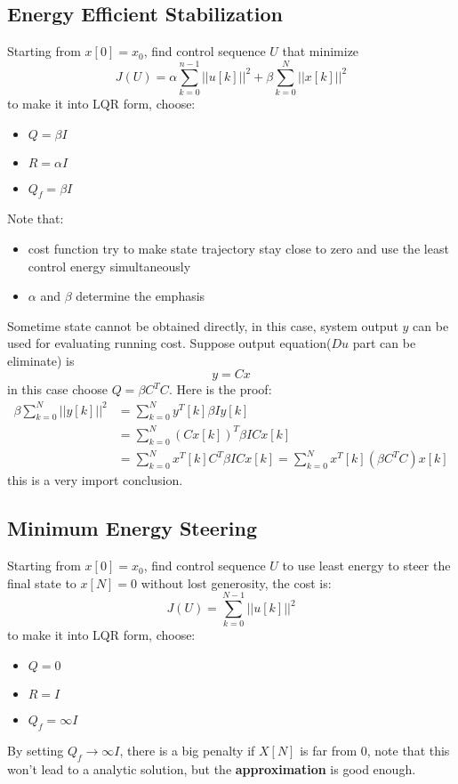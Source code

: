\documentclass[10pt,a4paper,oneside]{article}
\begin{document}
\subsection{Energy Efficient Stabilization}
Starting from $x[0] = x_0$, find control sequence $U$ that minimize
\[
J(U) = \alpha \sum_{k=0}^{n-1} || u[k] ||^2 + \beta \sum_{k=0}^{N} || x[k] ||^2
\]
to make it into LQR form, choose:
\begin{itemize}
	\item $Q = \beta I$
	\item $R = \alpha I$
	\item $Q_f = \beta I$
\end{itemize}
Note that:
\begin{itemize}
	\item cost function try to make state trajectory stay close to zero and use the least control energy simultaneously
	\item $\alpha$ and $\beta$ determine the emphasis 
\end{itemize}
Sometime state cannot be obtained directly, in this case, system output $y$ can be used for evaluating running cost. Suppose output equation($Du$ part can be eliminate) is
\[
y = Cx
\]
in this case choose $Q = \beta C^T C$. Here is the proof:
\begin{align*}
\beta \sum_{k=0}^{N} || y[k] ||^2 &=  \sum_{k=0}^{N} y^T [k] \beta I y[k]\\
&= \sum_{k=0}^{N} (Cx[k])^T \beta I Cx[k]\\
&= \sum_{k=0}^{N} x^T[k] C^T \beta I Cx[k] = \sum_{k=0}^{N} x^T[k] (\beta C^T C)x[k]
\end{align*}
this is a very import conclusion.

\subsection{Minimum Energy Steering}
Starting from $x[0] = x_0$, find control sequence $U$ to use least energy to steer the final state to $x[N] = 0$ without lost generosity, the cost is:
\[
J(U) = \sum_{k=0}^{N-1} ||u[k]||^2
\]
to make it into LQR form, choose:
\begin{itemize}
	\item $Q = 0$
	\item $R =  I$
	\item $Q_f = \infty I$
\end{itemize}
By setting $Q_f \rightarrow \infty I$, there is a big penalty if $X[N]$ is far from $0$, note that this won't lead to a analytic solution, but the \textbf{approximation} is good enough. 
\end{document}
